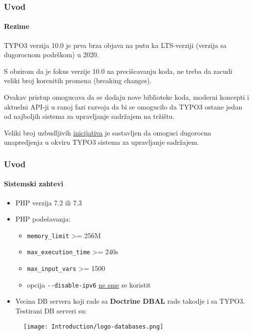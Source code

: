 \begin{frame}[fragile]
	\frametitle{Uvod}
	\framesubtitle{Rezime}

	\small
		TYPO3 verzija 10.0 je prva brza objava na putu ka LTS-verziji
		(verzija sa dugorocnom podrškom) u 2020.

		\vspace{0.2cm}

		S obzirom da je fokus verzije 10.0 na precišcavanju koda, ne treba da zacudi
		veliki broj korenitih promena (breaking changes).

		\vspace{0.2cm}

		Ovakav pristup omogucava da se dodaju nove biblioteke koda, moderni koncepti
		i aktuelni API-ji u ranoj fazi razvoja da bi se omogucilo da TYPO3 ostane jedan
		od najboljih sistema za upravljanje sadržajem na tržištu.
		\vspace{0.2cm}

		Veliki broj uzbudljivih
		\href{https://typo3.org/community/teams/typo3-development/initiatives/}{inicijativa}
		je sastavljen da omoguci dugorocna unapredjenja u okviru TYPO3 sistema za upravljanje sadržajem.
	\normalsize

\end{frame}


\begin{frame}[fragile]
	\frametitle{Uvod}
	\framesubtitle{Sistemski zahtevi}

	\begin{itemize}
		\item PHP verzija 7.2 ili 7.3
		\item PHP podešavanja:

			\begin{itemize}
				\item \texttt{memory\_limit} >= 256M
				\item \texttt{max\_execution\_time} >= 240s
				\item \texttt{max\_input\_vars} >= 1500
				\item opcija \texttt{-}\texttt{-disable-ipv6} \underline{ne sme} se koristit
			\end{itemize}

		\item Vecina DB servera koji rade sa \textbf{Doctrine DBAL} rade takodje i sa TYPO3.
			Testirani DB serveri su:
	\end{itemize}

	\begin{figure}
		\texttt{[image: Introduction/logo-databases.png]}
	\end{figure}

\end{frame}

